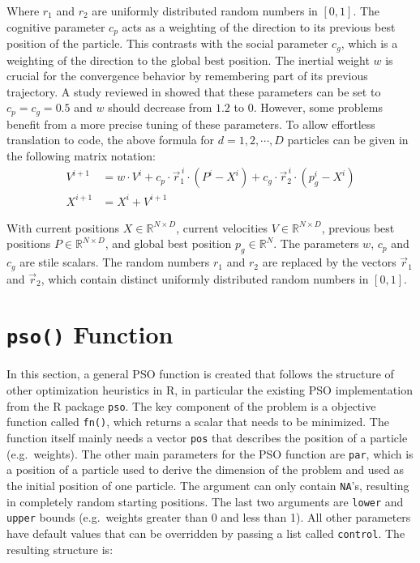 \documentclass[
  oneside]{book}
\begin{document}
Where \(r_1\) and \(r_2\) are uniformly distributed random numbers in \([0, 1]\). The cognitive parameter \(c_p\) acts as a weighting of the direction to its previous best position of the particle. This contrasts with the social parameter \(c_g\), which is a weighting of the direction to the global best position. The inertial weight \(w\) is crucial for the convergence behavior by remembering part of its previous trajectory. A study reviewed in \citep{PaVr2002} showed that these parameters can be set to \(c_p=c_g=0.5\) and \(w\) should decrease from \(1.2\) to \(0\). However, some problems benefit from a more precise tuning of these parameters. To allow effortless translation to code, the above formula for \(d = 1, 2, \cdots, D\) particles can be given in the following matrix notation:
\begin{align*}
  V^{i+1} &= w \cdot V^{i} + c_p \cdot \vec{r}_1^{\,i} \cdot (P^i-X^i) + c_g \cdot \vec{r}_2^{\,i} \cdot (p_g^i - X^i) \\
  X^{i+1} &= X^i + V^{i+1}
\end{align*}

With current positions \(X \in \mathbb{R}^{N \times D}\), current velocities \(V \in \mathbb{R}^{N \times D}\), previous best positions \(P \in \mathbb{R}^{N \times D}\), and global best position \(p_g \in \mathbb{R}^{N}\). The parameters \(w\), \(c_p\) and \(c_g\) are stile scalars. The random numbers \(r_1\) and \(r_2\) are replaced by the vectors \(\vec{r}_1\) and \(\vec{r}_2\), which contain distinct uniformly distributed random numbers in \([0, 1]\).

\hypertarget{pso-function}{%
\section{\texorpdfstring{\texttt{pso()} Function}{pso() Function}}\label{pso-function}}

In this section, a general PSO function is created that follows the structure of other optimization heuristics in R, in particular the existing PSO implementation from the R package \texttt{pso}. The key component of the problem is a objective function called \texttt{fn()}, which returns a scalar that needs to be minimized. The function itself mainly needs a vector \texttt{pos} that describes the position of a particle (e.g.~weights). The other main parameters for the PSO function are \texttt{par}, which is a position of a particle used to derive the dimension of the problem and used as the initial position of one particle. The argument can only contain \texttt{NA}'s, resulting in completely random starting positions. The last two arguments are \texttt{lower} and \texttt{upper} bounds (e.g.~weights greater than 0 and less than 1). All other parameters have default values that can be overridden by passing a list called \texttt{control}. The resulting structure is:
\end{document}
